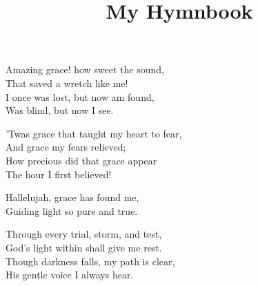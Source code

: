 \documentclass[12pt]{article}
\title{My Hymnbook}
\author{}
\date{}
\begin{document}
\maketitle
\tableofcontents
\newpage


\begin{stanza}
Amazing grace! how sweet the sound,\\
That saved a wretch like me!\\
I once was lost, but now am found,\\
Was blind, but now I see.
\end{stanza}

\begin{stanza}
’Twas grace that taught my heart to fear,\\
And grace my fears relieved;\\
How precious did that grace appear\\
The hour I first believed!
\end{stanza}

\begin{chorus}
Hallelujah, grace has found me,\\
Guiding light so pure and true.
\end{chorus}

\HymnBreak


\begin{stanza}
Through every trial, storm, and test,\\
God’s light within shall give me rest.\\
Though darkness falls, my path is clear,\\
His gentle voice I always hear.
\end{stanza}
\end{document}
